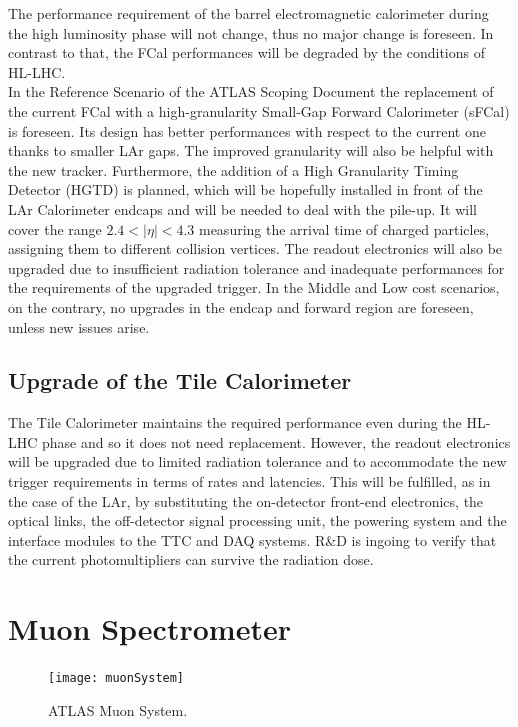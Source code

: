 \documentclass[a4paper,twoside,12pt]{book}
\begin{document}
The performance requirement of the barrel electromagnetic calorimeter during the high luminosity phase will not change, thus no major change is foreseen. In contrast to that, the FCal performances will be degraded by the conditions of HL-LHC. \\

In the Reference Scenario of the ATLAS Scoping Document\cite{scoping} the replacement of the current FCal with a high-granularity Small-Gap Forward Calorimeter (sFCal) is foreseen. Its design has better performances with respect to the current one thanks to smaller LAr gaps. The improved granularity will also be helpful with the new 
tracker. Furthermore, the addition of a High Granularity Timing Detector (HGTD) is planned, which will be hopefully installed in front of the LAr Calorimeter endcaps and will be needed to deal with the
pile-up. It will cover the range $2.4 < |\eta| < 4.3$ measuring the arrival time of charged particles, assigning them to different collision vertices. The readout electronics will also be upgraded due to insufficient radiation tolerance and inadequate performances for the requirements of the upgraded trigger. In the Middle and Low cost 
scenarios, on the contrary, no upgrades in the endcap and forward region are foreseen, unless new issues arise. \\

\subsection*{Upgrade of the Tile Calorimeter}

The Tile Calorimeter maintains the required performance even during the HL-LHC phase and
so it does not need replacement. However, the readout electronics will be upgraded due to limited radiation tolerance and to accommodate the new trigger requirements in terms of rates and latencies. This will be fulfilled, as in the case of the LAr, by substituting the on-detector front-end electronics, the optical links, the off-detector signal processing unit, the powering system and the interface modules to the TTC and DAQ systems. R\&D is ingoing to verify that the current photomultipliers can survive the radiation dose.

\section{Muon Spectrometer}\label{sec:muon}

\begin{figure} [h]
	\centering
	\texttt{[image: muonSystem]}
	\caption{ATLAS Muon System\cite{muon_tdr}.}
	\label{fig:muonSystem}
\end{figure}
\end{document}

